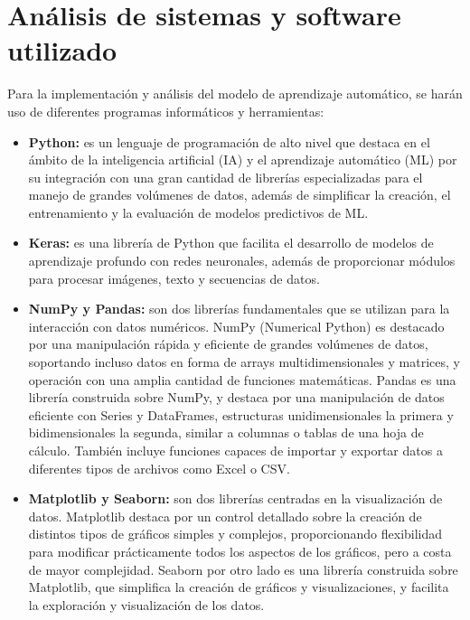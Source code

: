 \documentclass[12pt]{report} %
\begin{document}
\section{Análisis de sistemas y software utilizado}

Para la implementación y análisis del modelo de aprendizaje automático, se harán uso de diferentes programas informáticos y herramientas:

\begin{itemize}

    \item \textbf{Python:} es un lenguaje de programación de alto nivel que destaca en el ámbito de la inteligencia artificial (IA) y el aprendizaje automático (ML) por su integración con una gran cantidad de librerías especializadas para el manejo de grandes volúmenes de datos, además de simplificar la creación, el entrenamiento y la evaluación de modelos predictivos de ML. \cite{python}
    \item \textbf{Keras:} es una librería de Python que facilita el desarrollo de modelos de aprendizaje profundo con redes neuronales, además de proporcionar módulos para procesar imágenes, texto y secuencias de datos. \cite{keras}
    \item \textbf{NumPy y Pandas:} son dos librerías fundamentales que se utilizan para la interacción con datos numéricos. NumPy (Numerical Python) es destacado por una manipulación rápida y eficiente de grandes volúmenes de datos, soportando incluso datos en forma de arrays multidimensionales y matrices, y operación con una amplia cantidad de funciones matemáticas. \cite{numpy} Pandas es una librería construida sobre NumPy, y destaca por una manipulación de datos eficiente con Series y DataFrames, estructuras unidimensionales la primera y bidimensionales la segunda, similar a columnas o tablas de una hoja de cálculo. También incluye funciones capaces de importar y exportar datos a diferentes tipos de archivos como Excel o CSV. \cite{pandas}
	\item \textbf{Matplotlib y Seaborn:} son dos librerías centradas en la visualización de datos. Matplotlib destaca por un control detallado sobre la creación de distintos tipos de gráficos simples y complejos, proporcionando flexibilidad para modificar prácticamente todos los aspectos de los gráficos, pero a costa de mayor complejidad. \cite{matplotlib} Seaborn por otro lado es una librería construida sobre Matplotlib, que simplifica la creación de gráficos y visualizaciones, y facilita la exploración y visualización de los datos. \cite{seaborn}

\end{itemize}
\end{document}
